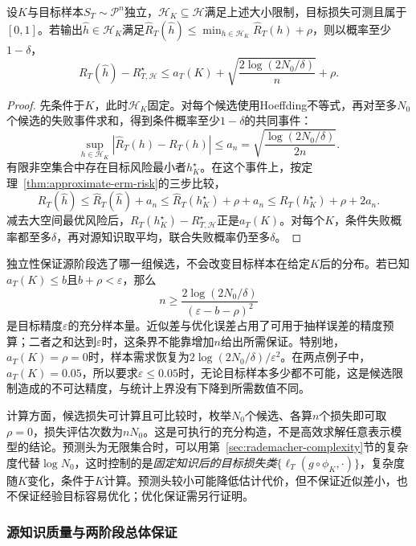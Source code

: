 \begin{theorem}[复用知识后的目标风险保证]
\label{thm:task-transfer-finite}
设$K$与目标样本$S_T\sim\mathcal P^n$独立，$\mathcal H_K\subseteq\mathcal H$满足上述大小限制，目标损失可测且属于$[0,1]$。若输出$\widehat h\in\mathcal H_K$满足$\widehat R_T(\widehat h)\leq\min_{h\in\mathcal H_K}\widehat R_T(h)+\rho$，则以概率至少$1-\delta$，
\begin{equation}
 R_T(\widehat h)-R_{T,\mathcal H}^{\star}
 \leq a_T(K)+\sqrt{\frac{2\log(2N_0/\delta)}{n}}+\rho .
 \label{eq:task-transfer-finite}
\end{equation}
\end{theorem}
\begin{proof}
先条件于$K$，此时$\mathcal H_K$固定。对每个候选使用Hoeffding不等式，再对至多$N_0$个候选的失败事件求和，得到条件概率至少$1-\delta$的共同事件：
\[
 \sup_{h\in\mathcal H_K}|\widehat R_T(h)-R_T(h)|
 \leq a_n=\sqrt{\frac{\log(2N_0/\delta)}{2n}} .
\]
有限非空集合中存在目标风险最小者$h_K^\star$。在这个事件上，按定理~\ref{thm:approximate-erm-risk}的三步比较，
\[
 R_T(\widehat h)\leq\widehat R_T(\widehat h)+a_n
 \leq\widehat R_T(h_K^\star)+\rho+a_n
 \leq R_T(h_K^\star)+\rho+2a_n .
\]
减去大空间最优风险后，$R_T(h_K^\star)-R_{T,\mathcal H}^{\star}$正是$a_T(K)$。对每个$K$，条件失败概率都至多$\delta$，再对源知识取平均，联合失败概率仍至多$\delta$。
\end{proof}

独立性保证源阶段选了哪一组候选，不会改变目标样本在给定$K$后的分布。若已知$a_T(K)\leq b$且$b+\rho<\varepsilon$，那么
\[
 n\geq\frac{2\log(2N_0/\delta)}{(\varepsilon-b-\rho)^2}
\]
是目标精度$\varepsilon$的充分样本量。近似差与优化误差占用了可用于抽样误差的精度预算；二者之和达到$\varepsilon$时，这条界不能靠增加$n$给出所需保证。特别地，$a_T(K)=\rho=0$时，样本需求恢复为$2\log(2N_0/\delta)/\varepsilon^2$。在两点例子中，$a_T(K)=0.05$，所以要求$\varepsilon\leq0.05$时，无论目标样本多少都不可能，这是候选限制造成的不可达精度，与统计上界没有下降到所需数值不同。

计算方面，候选损失可计算且可比较时，枚举$N_0$个候选、各算$n$个损失即可取$\rho=0$，损失评估次数为$nN_0$。这是可执行的充分构造，不是高效求解任意表示模型的结论。预测头为无限集合时，可以用第~\ref{sec:rademacher-complexity}节的复杂度代替$\log N_0$，这时控制的是\emph{固定知识后的目标损失类}$\{\ell_T(g\circ\phi_K,\cdot)\}$，复杂度随$K$变化，条件于$K$计算。预测头较小可能降低估计代价，但不保证近似差小，也不保证经验目标容易优化；优化保证需另行证明。

\subsubsection{源知识质量与两阶段总体保证}


